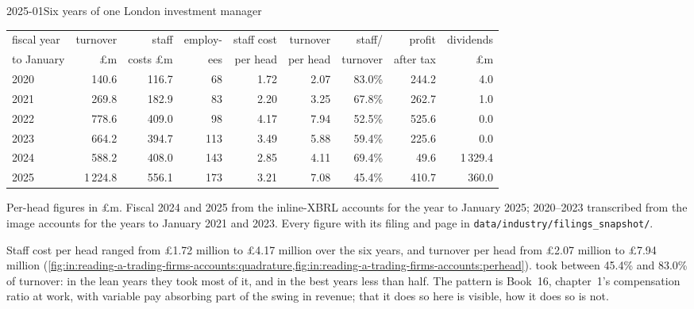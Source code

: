 \begin{dated}{2025-01}{Six years of one London investment manager}\label{dat:in:reading-a-trading-firms-accounts:quadrature}
\footnotesize
\begin{tabular}{@{}lrrrrrrrr@{}}
\toprule
fiscal year & turnover & staff & employ- & staff cost & turnover & staff/ & profit & dividends\\
to January & \pounds m & costs \pounds m & ees & per head & per head & turnover & after tax & \pounds m\\
\midrule
2020 & 140.6 & 116.7 & 68 & 1.72 & 2.07 & 83.0\% & 244.2 & 4.0\\
2021 & 269.8 & 182.9 & 83 & 2.20 & 3.25 & 67.8\% & 262.7 & 1.0\\
2022 & 778.6 & 409.0 & 98 & 4.17 & 7.94 & 52.5\% & 525.6 & 0.0\\
2023 & 664.2 & 394.7 & 113 & 3.49 & 5.88 & 59.4\% & 225.6 & 0.0\\
2024 & 588.2 & 408.0 & 143 & 2.85 & 4.11 & 69.4\% & 49.6 & 1\,329.4\\
2025 & 1\,224.8 & 556.1 & 173 & 3.21 & 7.08 & 45.4\% & 410.7 & 360.0\\
\bottomrule
\end{tabular}

\smallskip\noindent Per-head figures in \pounds m. Fiscal 2024 and 2025 from the inline-XBRL accounts for the year to
January 2025; 2020--2023 transcribed from the image accounts for the years to January 2021 and 2023. Every figure with
its filing and page in \texttt{data/industry/filings\_snapshot/}.
\end{dated}

Staff cost per head ranged from \pounds1.72 million to \pounds4.17 million over the six years, and turnover per head from
\pounds2.07 million to \pounds7.94 million (\cref{fig:in:reading-a-trading-firms-accounts:quadrature,fig:in:reading-a-trading-firms-accounts:perhead}).
 took between 45.4\% and 83.0\% of turnover: in the lean years they took most of it, and in the best years
less than half. The pattern is Book~16, chapter~1's compensation ratio at work, with variable pay absorbing part of the
swing in revenue; that it does so here is visible, how it does so is not.


